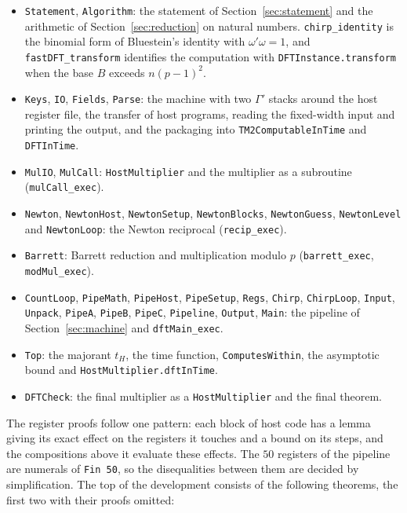 \documentclass[11pt]{amsart}
\newcommand{\lean}[1]{\texttt{#1}}
\begin{document}
\begin{itemize}
\item \lean{Statement}, \lean{Algorithm}: the statement of Section~\ref{sec:statement} and the
  arithmetic of Section~\ref{sec:reduction} on natural numbers. \lean{chirp\_identity} is the
  binomial form of Bluestein's identity with $\omega'\omega = 1$, and
  \lean{fastDFT\_transform} identifies the computation with \lean{DFTInstance.transform} when
  the base $B$ exceeds $n(p-1)^2$.
\item \lean{Keys}, \lean{IO}, \lean{Fields}, \lean{Parse}: the machine with two $\Gamma'$ stacks
  around the host register file, the transfer of host programs, reading the fixed-width input
  and printing the output, and the packaging into \lean{TM2ComputableInTime} and
  \lean{DFTInTime}.
\item \lean{MulIO}, \lean{MulCall}: \lean{HostMultiplier} and the multiplier as a subroutine
  (\lean{mulCall\_exec}).
\item \lean{Newton}, \lean{NewtonHost}, \lean{NewtonSetup}, \lean{NewtonBlocks},
  \lean{NewtonGuess}, \lean{NewtonLevel} and \lean{NewtonLoop}: the Newton reciprocal
  (\lean{recip\_exec}).
\item \lean{Barrett}: Barrett reduction and multiplication modulo $p$ (\lean{barrett\_exec},
  \lean{modMul\_exec}).
\item \lean{CountLoop}, \lean{PipeMath}, \lean{PipeHost}, \lean{PipeSetup}, \lean{Regs},
  \lean{Chirp}, \lean{ChirpLoop}, \lean{Input}, \lean{Unpack}, \lean{PipeA}, \lean{PipeB},
  \lean{PipeC}, \lean{Pipeline}, \lean{Output}, \lean{Main}: the pipeline of
  Section~\ref{sec:machine} and \lean{dftMain\_exec}.
\item \lean{Top}: the majorant $t_H$, the time function, \lean{ComputesWithin}, the
  asymptotic bound and \lean{HostMultiplier.dftInTime}.
\item \lean{DFTCheck}: the final multiplier as a \lean{HostMultiplier} and the final theorem.
\end{itemize}

The register proofs follow one pattern: each block of host code has a lemma giving its exact
effect on the registers it touches and a bound on its steps, and the compositions above it
evaluate these effects. The $50$ registers of the pipeline are numerals of \lean{Fin 50}, so
the disequalities between them are decided by simplification. The top of the development
consists of the following theorems, the first two with their proofs omitted:
\end{document}
